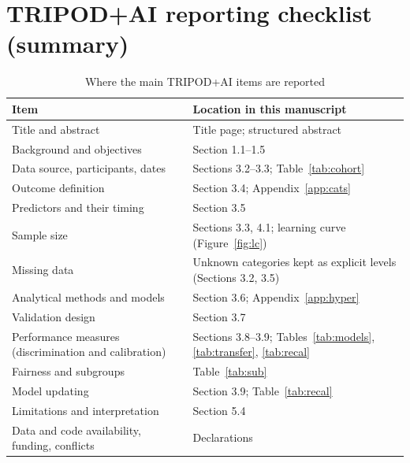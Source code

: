 \documentclass[11pt,a4paper]{article}
\begin{document}
\section{TRIPOD+AI reporting checklist (summary)}\label{app:tripod}
\begin{table}[H]
\caption{Where the main TRIPOD+AI items are reported}\label{tab:tripod}
\centering\footnotesize
\begin{tabular}{>{\raggedright\arraybackslash}p{5.4cm}>{\raggedright\arraybackslash}p{9.4cm}}
\toprule
Item & Location in this manuscript \\
\midrule
Title and abstract & Title page; structured abstract \\
Background and objectives & Section 1.1--1.5 \\
Data source, participants, dates & Sections 3.2--3.3; Table~\ref{tab:cohort} \\
Outcome definition & Section 3.4; Appendix~\ref{app:cats} \\
Predictors and their timing & Section 3.5 \\
Sample size & Sections 3.3, 4.1; learning curve (Figure~\ref{fig:lc}) \\
Missing data & Unknown categories kept as explicit levels (Sections 3.2, 3.5) \\
Analytical methods and models & Section 3.6; Appendix~\ref{app:hyper} \\
Validation design & Section 3.7 \\
Performance measures (discrimination and calibration) & Sections 3.8--3.9; Tables~\ref{tab:models}, \ref{tab:transfer}, \ref{tab:recal} \\
Fairness and subgroups & Table~\ref{tab:sub} \\
Model updating & Section 3.9; Table~\ref{tab:recal} \\
Limitations and interpretation & Section 5.4 \\
Data and code availability, funding, conflicts & Declarations \\
\bottomrule
\end{tabular}
\end{table}
\end{document}
